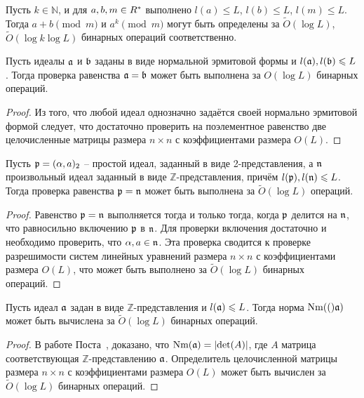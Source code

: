 \documentclass[_00_dissertation.tex]{subfiles}
\begin{document}
\begin{corollary}\label{corollary:mod}
    Пусть $k \in \mathbb{N}$, и для $a, b, m \in R^{*}$ выполнено $l(a) \leq L$, $l(b) \leq L$, $l(m) \leq L$.
    Тогда $a + b \pmod{m}$ и $a^k \pmod{m}$ могут быть определены за $\tilde{O}(\log L)$, $\tilde{O}(\log k \log L)$  бинарных операций соответственно.
\end{corollary}

\begin{proposition}\label{proposition:equality}
    Пусть идеалы $\mathfrak{a}$ и $\mathfrak{b}$ заданы в виде нормальной эрмитовой формы и $l(\mathfrak{a}), l(\mathfrak{b}) \leqslant L$.
    Тогда проверка равенства $\mathfrak{a} = \mathfrak{b}$ может быть выполнена за $O(\log L)$ бинарных операций.
\end{proposition}
\begin{proof}
    Из того, что любой идеал однозначно задаётся своей нормально эрмитовой формой следует, что достаточно проверить на поэлементное равенство две целочисленные матрицы размера $n \times n$ с коэффициентами размера $O(L)$.
\end{proof}

\begin{proposition}\label{proposition:particular_equality}
    Пусть $\mathfrak{p} = (\alpha, a)_2$ -- простой идеал, заданный в виде 2-представления, а $\mathfrak{n}$ произвольный идеал заданный в виде $\mathbb{Z}$-представления, причём $l(\mathfrak{p}), l(\mathfrak{n}) \leqslant L$.
    Тогда проверка равенства $\mathfrak{p} = \mathfrak{n}$ может быть выполнена за $\tilde{O}(\log L)$ операций.
\end{proposition}
\begin{proof}
    Равенство $\mathfrak{p} = \mathfrak{n}$ выполняется тогда и только тогда, когда $\mathfrak{p}$ делится на $\mathfrak{n}$, что равносильно включению $\mathfrak{p}$ в $\mathfrak{n}$.
    Для проверки включения достаточно  и необходимо проверить, что $\alpha, a \in \mathfrak{n}$.
    Эта проверка сводится к проверке разрешимости систем линейных уравнений размера $n \times n$ с коэффициентами размера $O(L)$, что может быть выполнено за $\tilde{O}(\log L)$ бинарных операций.
\end{proof}

\begin{proposition}\label{proposition:norm}
    Пусть идеал $\mathfrak{a}$ задан в виде $\mathbb{Z}$-представления и $l(\mathfrak{a}) \leqslant L$.
    Тогда норма $\textrm{Nm}(()\mathfrak{a})$ может быть вычислена за $\tilde{O}(\log L)$ бинарных операций.
\end{proposition}
\begin{proof}
    В работе Поста~\cite{Post}, доказано, что $\textrm{Nm}(\mathfrak{a}) = |\mathrm{det}(A)|$, где $A$ матрица соответствующая $\mathbb{Z}$-представлению $\mathfrak{a}$.
    Определитель целочисленной матрицы размера $n \times n$ с коэффициентами размера $O(L)$ может быть вычислен за $\tilde{O}(\log L)$ бинарных операций.
\end{proof}
\end{document}
